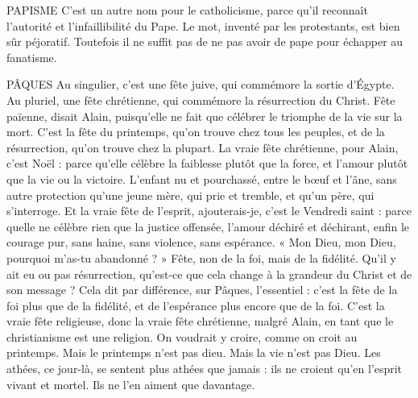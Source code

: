 PAPISME C’est un autre nom pour le catholicisme, parce qu’il reconnaît
l'autorité et l’infaillibilité du Pape. Le mot, inventé par les protestants,
est bien sûr péjoratif. Toutefois il ne suffit pas de ne pas avoir de pape
pour échapper au fanatisme.

PÂQUES Au singulier, c’est une fête juive, qui commémore la sortie d'Égypte.
Au pluriel, une fête chrétienne, qui commémore la résurrection du
Christ. Fête païenne, disait Alain, puisqu'elle ne fait que célébrer le triomphe
de la vie sur la mort. C’est la fête du printemps, qu’on trouve chez tous les
peuples, et de la résurrection, qu’on trouve chez la plupart. La vraie fête chrétienne,
pour Alain, c’est Noël : parce qu’elle célèbre la faiblesse plutôt que la
force, et l'amour plutôt que la vie ou la victoire. L'enfant nu et pourchassé,
entre le bœuf et l’âne, sans autre protection qu’une jeune mère, qui prie et
tremble, et qu’un père, qui s'interroge. Et la vraie fête de l'esprit, ajouterais-je,
c'est le Vendredi saint : parce quelle ne célèbre rien que la justice offensée,
l'amour déchiré et déchirant, enfin le courage pur, sans haine, sans violence,
sans espérance. « Mon Dieu, mon Dieu, pourquoi m’as-tu abandonné ? » Fête,
non de la foi, mais de la fidélité. Qu'il y ait eu ou pas résurrection, qu'est-ce
que cela change à la grandeur du Christ et de son message ? Cela dit par différence,
sur Pâques, l'essentiel : c’est la fête de la foi plus que de la fidélité, et de
l'espérance plus encore que de la foi. C’est la vraie fête religieuse, donc la vraie
fête chrétienne, malgré Alain, en tant que le christianisme est une religion. On
voudrait y croire, comme on croit au printemps. Mais le printemps n’est pas
dieu. Mais la vie n’est pas Dieu. Les athées, ce jour-là, se sentent plus athées
que jamais : ils ne croient qu’en l'esprit vivant et mortel. Ils ne l’en aiment que
davantage.

